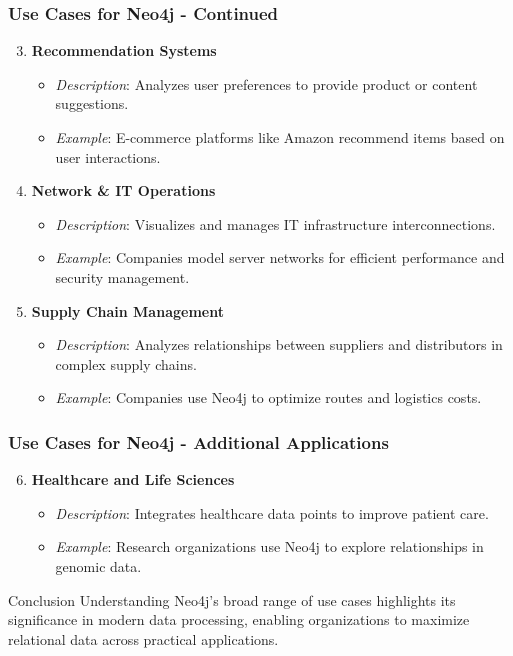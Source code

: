 \documentclass[aspectratio=169]{beamer}
\begin{document}
\begin{frame}[fragile]
    \frametitle{Use Cases for Neo4j - Continued}
    \begin{enumerate}
        \setcounter{enumii}{2} %
        \item \textbf{Recommendation Systems}
            \begin{itemize}
                \item \textit{Description}: Analyzes user preferences to provide product or content suggestions.
                \item \textit{Example}: E-commerce platforms like Amazon recommend items based on user interactions.
            \end{itemize}

        \item \textbf{Network \& IT Operations}
            \begin{itemize}
                \item \textit{Description}: Visualizes and manages IT infrastructure interconnections.
                \item \textit{Example}: Companies model server networks for efficient performance and security management.
            \end{itemize}
        
        \item \textbf{Supply Chain Management}
            \begin{itemize}
                \item \textit{Description}: Analyzes relationships between suppliers and distributors in complex supply chains.
                \item \textit{Example}: Companies use Neo4j to optimize routes and logistics costs.
            \end{itemize}
    \end{enumerate}
\end{frame}

\begin{frame}[fragile]
    \frametitle{Use Cases for Neo4j - Additional Applications}
    \begin{enumerate}
        \setcounter{enumii}{5} %
        \item \textbf{Healthcare and Life Sciences}
            \begin{itemize}
                \item \textit{Description}: Integrates healthcare data points to improve patient care.
                \item \textit{Example}: Research organizations use Neo4j to explore relationships in genomic data.
            \end{itemize}
    \end{enumerate}

    \begin{block}{Conclusion}
        Understanding Neo4j's broad range of use cases highlights its significance in modern data processing,
        enabling organizations to maximize relational data across practical applications.
    \end{block}
\end{frame}
\end{document}
